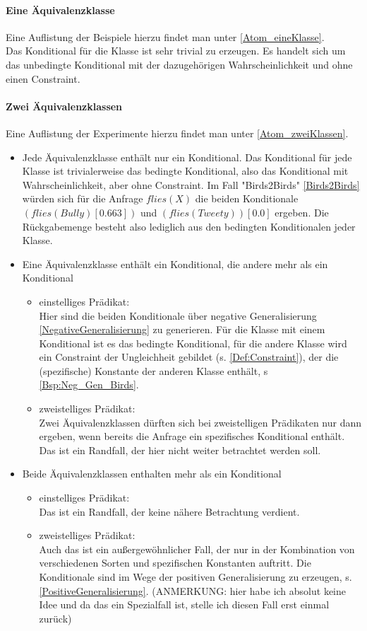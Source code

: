 \documentclass[a4paper, 11pt]{book}
\begin{document}
\paragraph{ Eine Äquivalenzklasse}
Eine Auflistung der Beispiele hierzu findet man unter \ref{Atom_eineKlasse}.\\
Das Konditional für die Klasse ist sehr trivial zu erzeugen. Es handelt sich um das unbedingte Konditional mit der dazugehörigen Wahrscheinlichkeit und ohne einen Constraint.
\paragraph{ Zwei Äquivalenzklassen}
Eine Auflistung der  Experimente hierzu findet man unter \ref{Atom_zweiKlassen}.
\begin{itemize}
\item Jede Äquivalenzklasse enthält nur ein Konditional. Das Konditional für jede Klasse ist trivialerweise das bedingte Konditional, also das Konditional mit Wahrscheinlichkeit, aber ohne Constraint. Im Fall "{}Birds2Birds"{} \ref{Birds2Birds} würden sich für die Anfrage $flies(X)$ die beiden Konditionale $ (flies(Bully)[0.663]) $ und $ (flies(Tweety))[0.0] $ ergeben. Die Rückgabemenge besteht also lediglich aus den bedingten Konditionalen jeder Klasse.
\item Eine Äquivalenzklasse enthält ein Konditional, die andere mehr als ein Konditional
\begin{itemize}
	\item einstelliges Prädikat:\\
	Hier sind die beiden Konditionale über negative Generalisierung \ref{NegativeGeneralisierung} zu generieren. Für die Klasse mit einem Konditional ist es das bedingte Konditional, für die andere Klasse wird ein Constraint der Ungleichheit gebildet (s. \ref{Def:Constraint}), der die (spezifische) Konstante der anderen Klasse enthält, s \ref{Bsp:Neg_Gen_Birds}. 
	\item zweistelliges Prädikat:\\
	Zwei Äquivalenzklassen dürften sich bei zweistelligen Prädikaten nur dann ergeben, wenn bereits die Anfrage ein spezifisches Konditional enthält. Das ist ein Randfall, der hier nicht weiter betrachtet werden soll. 
\end{itemize}
\item Beide Äquivalenzklassen enthalten mehr als ein Konditional
\begin{itemize}
	\item {einstelliges Prädikat:}\\
	Das ist ein Randfall, der keine nähere Betrachtung verdient.
	\item zweistelliges Prädikat:\\
	Auch das ist ein außergewöhnlicher Fall, der nur in der Kombination von verschiedenen Sorten und spezifischen Konstanten auftritt. Die Konditionale sind im Wege der positiven Generalisierung zu erzeugen, s. \ref{PositiveGeneralisierung}.
	(ANMERKUNG: hier habe ich absolut keine Idee und da das ein Spezialfall ist, stelle ich diesen Fall erst einmal zurück)
\end{itemize}
\end{itemize}
\end{document}
